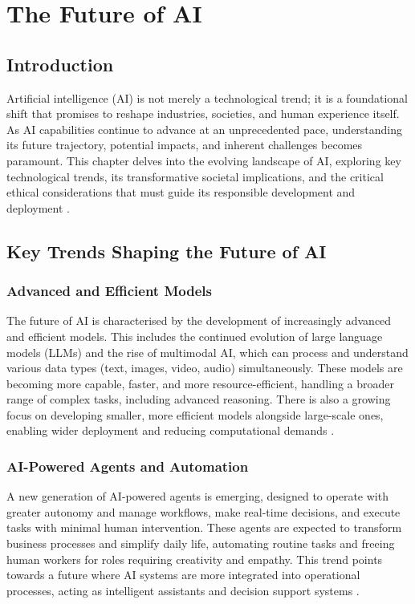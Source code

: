 \chapter{The Future of AI}
\label{cha:the_future_of_ai}

\section{Introduction}

Artificial intelligence (AI) is not merely a technological trend; it is a foundational shift that promises to reshape industries, societies, and human experience itself. As AI capabilities continue to advance at an unprecedented pace, understanding its future trajectory, potential impacts, and inherent challenges becomes paramount. This chapter delves into the evolving landscape of AI, exploring key technological trends, its transformative societal implications, and the critical ethical considerations that must guide its responsible development and deployment \parencite{reed2023future}.

\section{Key Trends Shaping the Future of AI}

\subsection{Advanced and Efficient Models}

The future of AI is characterised by the development of increasingly advanced and efficient models. This includes the continued evolution of large language models (LLMs) and the rise of multimodal AI, which can process and understand various data types (text, images, video, audio) simultaneously. These models are becoming more capable, faster, and more resource-efficient, handling a broader range of complex tasks, including advanced reasoning. There is also a growing focus on developing smaller, more efficient models alongside large-scale ones, enabling wider deployment and reducing computational demands \parencite{aiindex2023}.

\subsection{AI-Powered Agents and Automation}

A new generation of AI-powered agents is emerging, designed to operate with greater autonomy and manage workflows, make real-time decisions, and execute tasks with minimal human intervention. These agents are expected to transform business processes and simplify daily life, automating routine tasks and freeing human workers for roles requiring creativity and empathy. This trend points towards a future where AI systems are more integrated into operational processes, acting as intelligent assistants and decision support systems \parencite{reed2023future}.

